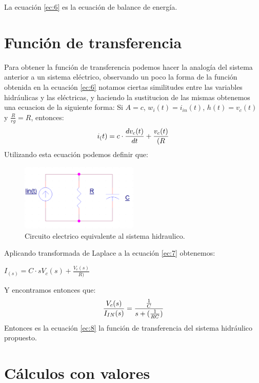 \documentclass[letterpaper,spanish,12pt]{report}
\begin{document}
La ecuaci\'on \ref{ec:6} es la ecuaci\'on de balance de energ\'ia.

\section{Funci\'on de transferencia}

Para obtener la funci\'on de transferencia podemos hacer la analog\'ia del sistema anterior a un sistema el\'ectrico, observando un poco la forma de la funci\'on obtenida en la ecuaci\'on \ref{ec:6} notamos ciertas similitudes entre las variables hidr\'aulicas y las el\'ectricas, y haciendo la sustitucion de las mismas obtenemos una ecuacion de la siguiente forma:
Si $A = c$, $w_{i}(t) = i_{in}(t)$, $h(t) = v_{c}(t)$ y $\frac {R} {rg} = R$, entonces:
	\begin{equation}
		\centering
			i_(t) = c \cdot \frac {dv_{c}(t)} {dt} + \frac {v_{c}(t)} {(R} 
		\label{ec:7}
	\end{equation}
Utilizando esta ecuaci\'on podemos definir que:

\begin{figure}[h]
	\centering
		\includegraphics[width=0.50\textwidth]{RC2.eps}
	\caption{Circuito electrico equivalente al sistema hidraulico.}
	\label{fig:RC2}
\end{figure}

Aplicando transformada de Laplace a la ecuaci\'on \ref{ec:7} obtenemos:
	\begin{center}$I_(s) = C \cdot sV_{c}(s) + \frac {V_{c}(s)} {R)} $\end{center}
Y encontramos entonces que:
	\begin{equation}
		\centering
			\frac {V_{c}(s)} {I_{IN}(s)} = \frac {\frac {1} {C}} {s + (\frac {1} {RC})}
		\label{ec:8}
	\end{equation}
Entonces es la ecuaci\'on \ref{ec:8} la funci\'on de transferencia del sistema hidr\'aulico propuesto.

\section{C\'alculos con valores}
\end{document}
